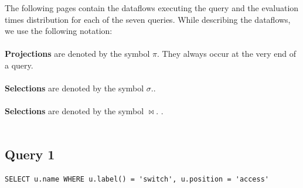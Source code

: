 \documentclass[11pt,singlecolumn]{scrartcl}
\begin{document}
The following pages contain the dataflows executing the query and the evaluation times distribution for each of the seven queries. While describing the dataflows, we use the following notation:\\\\
\textbf{Projections} are denoted by the symbol \(\pi\). They always occur at the very end of a query.\\\\
\textbf{Selections} are denoted by the symbol \(\sigma\)..\\\\
\textbf{Selections} are denoted by the symbol \(\bowtie\).  .\\\\

\clearpage

\subsection{Query 1}
\begin{verbatim}
SELECT u.name WHERE u.label() = 'switch', u.position = 'access'
\end{verbatim}
\end{document}
